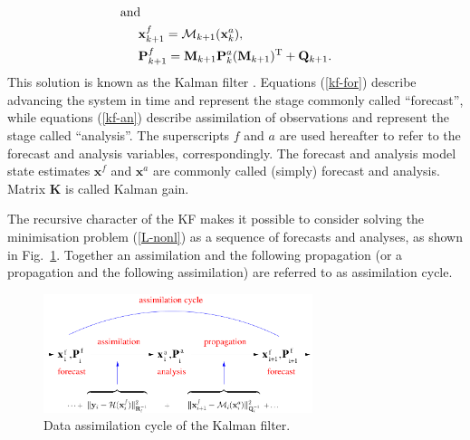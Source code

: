 \documentclass[11pt]{report}
\newcommand{\mb} {\mathbf}
\newcommand{\T}{^{\tiny \mathrm T}}
\begin{document}
\vspace{-8mm}
\begin{subequations}
  \label{kf-for}
  \begin{align}
    \label{prop-x}
    \nonumber
    & \hspace{-0.5cm} \text{and}\\
    & \mb x^f_{k+1} = \mathcal M_{k+1}(\mb x_k^a),\\
    \label{prop-P}
    & \mb P_{k+1}^f = \mb M_{k+1} \mb P_k^a (\mb M_{k+1})\T + \mb Q_{k+1}.
  \end{align}
\end{subequations}
This solution is known as the Kalman filter \citep[KF,][]{kal60}.
Equations (\ref{kf-for}) describe advancing the system in time and represent the stage commonly called ``forecast'', while equations (\ref{kf-an}) describe assimilation of observations and represent the stage called ``analysis''.
The superscripts $f$ and $a$ are used hereafter to refer to the forecast and analysis variables, correspondingly.
The forecast and analysis model state estimates $\mb x^f$ and $\mb x^a$ are commonly called (simply) forecast and analysis.
Matrix $\mb K$ is called Kalman gain.

The recursive character of the KF makes it possible to consider solving the minimisation problem (\ref{L-nonl}) as a sequence of forecasts and analyses, as shown in Fig.~\ref{fig:dacycle}.
Together an assimilation and the following propagation (or a propagation and the following assimilation) are referred to as assimilation cycle.
\begin{figure}
  \centering
  \includegraphics[width = 0.7\textwidth]{plots/dacycle.pdf}
  \caption{Data assimilation cycle of the Kalman filter.}
  \label{fig:dacycle}
\end{figure}
\end{document}
